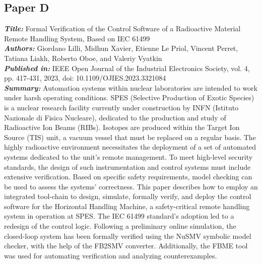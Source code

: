 \subsection{Paper D}
\textbf{\textit{Title:}} Formal Verification of the Control Software of a Radioactive Material Remote Handling System, Based on IEC 61499\\
\textbf{\textit{Authors:}} Giordano Lilli, Midhun Xavier, Etienne Le Priol, Vincent Perret, Tatiana Liakh, Roberto Oboe, and Valeriy Vyatkin\\
\textbf{\textit{Published in:}} IEEE Open Journal of the Industrial Electronics Society, vol. 4, pp. 417-431, 2023, doi: 10.1109/OJIES.2023.3321084\\
\textbf{\textit{Summary:}} Automation systems within nuclear laboratories are intended to work under harsh operating conditions. SPES (Selective Production of Exotic Species) is a nuclear research facility currently under construction by INFN (Istituto Nazionale di Fisica Nucleare), dedicated to the production and study of Radioactive Ion Beams (RIBs). Isotopes are produced within the Target Ion Source (TIS) unit, a vacuum vessel that must be replaced on a regular basis. The highly radioactive environment necessitates the deployment of a set of automated systems dedicated to the unit's remote management. To meet high-level security standards, the design of such instrumentation and control systems must include extensive verification. Based on specific safety requirements, model checking can be used to assess the systems' correctness. This paper describes how to employ an integrated tool-chain to design, simulate, formally verify, and deploy the control software for the Horizontal Handling Machine, a safety-critical remote handling system in operation at SPES. The IEC 61499 standard's adoption led to a redesign of the control logic. Following a preliminary online simulation, the closed-loop system has been formally verified using the NuSMV symbolic model checker, with the help of the FB2SMV converter. Additionally, the FBME tool was used for automating verification and analyzing counterexamples.\\

